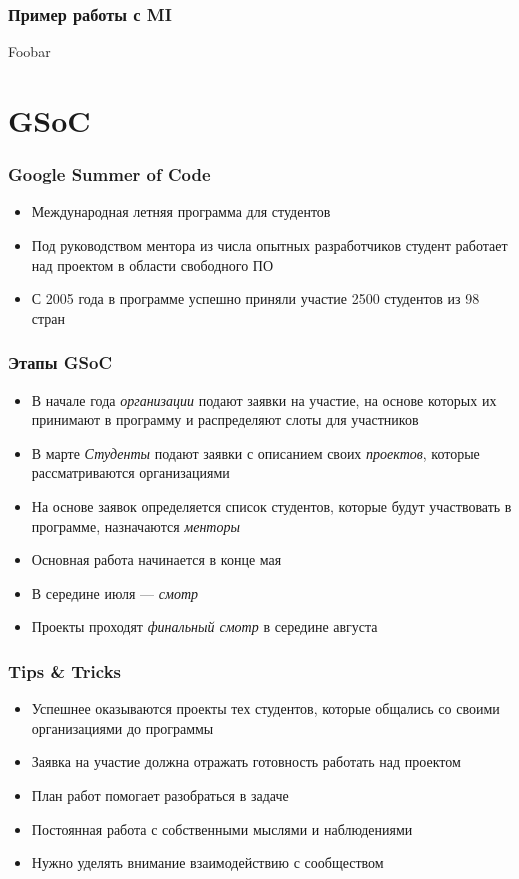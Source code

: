 \documentclass[onlymath]{beamer}
\newcommand\neword\emph
\begin{document}
\begin{frame}
 \frametitle{Пример работы с MI}

Foobar
\end{frame}

\section{GSoC}
\begin{frame}
  \frametitle{Google Summer of Code}

  \begin{itemize}
  \item Международная летняя программа для студентов
  \item Под руководством ментора из числа опытных разработчиков
    студент работает над проектом в области свободного \textsc{ПО}
  \item С 2005 года в программе успешно приняли участие 2500 студентов
    из 98 стран
  \end{itemize}
\end{frame}

\begin{frame}
  \frametitle{Этапы GSoC}
  \begin{itemize}
  \item В начале года \neword{организации} подают заявки на участие,
    на основе которых их принимают в программу и распределяют слоты
    для участников
  \item В марте \neword{Студенты} подают заявки с описанием своих
    \neword{проектов}, которые рассматриваются организациями
  \item На основе заявок определяется список студентов, которые будут
    участвовать в программе, назначаются \neword{менторы}
  \item Основная работа начинается в конце мая
  \item В середине июля — \neword{смотр}
  \item Проекты проходят \neword{финальный смотр} в середине августа
  \end{itemize}
\end{frame}

\begin{frame}
  \frametitle{Tips \& Tricks}
  \begin{itemize}
  \item Успешнее оказываются проекты тех студентов, которые общались
    со своими организациями до программы
    
  \item Заявка на участие должна отражать готовность работать над
    проектом

  \item План работ помогает разобраться в задаче
    
  \item Постоянная работа с собственными мыслями и наблюдениями
    
  \item Нужно уделять внимание взаимодействию с сообществом
  \end{itemize}
\end{frame}
\end{document}
